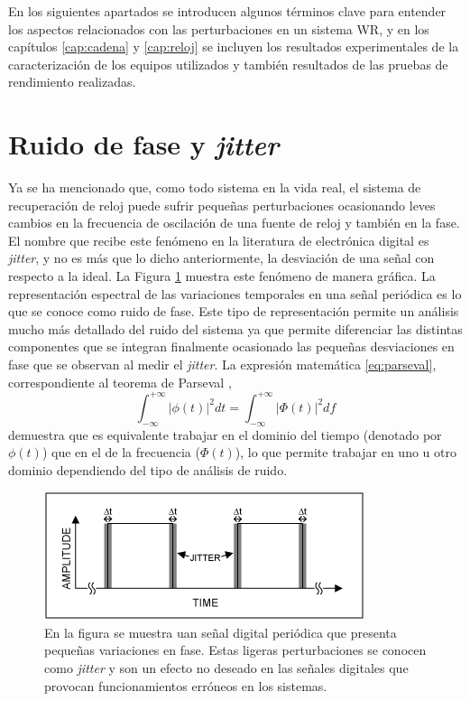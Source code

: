 En los siguientes apartados se introducen algunos términos clave para entender 
los aspectos relacionados con las perturbaciones en un sistema WR, y en los 
capítulos \ref{cap:cadena} y \ref{cap:reloj} se incluyen los resultados 
experimentales de la caracterización de los equipos utilizados y también 
resultados de las pruebas de rendimiento realizadas.

\section{Ruido de fase y \textit{jitter}}

Ya se ha mencionado que, como todo sistema en la vida real, el sistema de 
recuperación de reloj puede sufrir pequeñas perturbaciones ocasionando 
leves cambios en la frecuencia de oscilación de una fuente de reloj y 
también en la fase. El nombre que recibe este fenómeno en la literatura de 
electrónica digital es \textit{jitter}, y no es más que lo dicho anteriormente, 
la desviación de una señal con respecto a la ideal. La Figura \ref{fig:jitter} 
muestra este fenómeno de manera gráfica. La representación espectral de las 
variaciones temporales en una señal periódica es lo que se conoce como ruido de 
fase. Este tipo de representación permite un análisis mucho más detallado del 
ruido del sistema ya que permite diferenciar las distintas componentes que se 
integran finalmente ocasionado las pequeñas desviaciones en fase que se 
observan al medir el \textit{jitter}. La expresión matemática 
\ref{eq:parseval}, correspondiente al teorema de Parseval \cite{oppenheim96},
\begin{equation}\label{eq:parseval}
\int_{-\infty}^{+\infty} | \phi (t) |^2 dt = 
\int_{-\infty}^{+\infty} | \Phi (t) |^2 df
\end{equation}
 demuestra que es equivalente trabajar en el dominio del tiempo (denotado por 
 $\phi (t)$) que en el de la frecuencia ($\Phi (t)$), lo que permite trabajar 
 en uno u otro dominio dependiendo del tipo de análisis de ruido.



\begin{figure}
	\centering
	\includegraphics[width=0.5\linewidth]{imagenes/jitter}
	\caption[Ilustración del fenómeno conocido como \textit{jitter}]{En la 
	figura se muestra uan señal digital periódica que presenta pequeñas 
	variaciones en fase. Estas ligeras perturbaciones se conocen como 
	\textit{jitter} y son un efecto no deseado en las señales digitales que 
	provocan funcionamientos erróneos en los sistemas.}
	\label{fig:jitter}
\end{figure}


